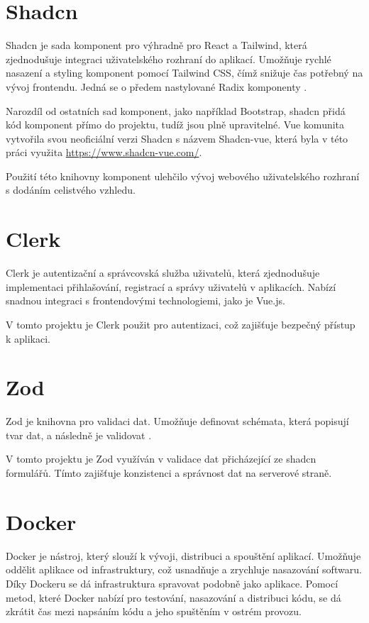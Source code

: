 \section{Shadcn}
Shadcn je sada komponent pro výhradně pro React a Tailwind, která zjednodušuje integraci uživatelského rozhraní do aplikací. Umožňuje rychlé nasazení a styling komponent pomocí Tailwind CSS, čímž snižuje čas potřebný na vývoj frontendu. Jedná se o předem nastylované Radix komponenty \cite{shadcnIntroduction}.

Narozdíl od ostatních sad komponent, jako například Bootstrap, shadcn přidá kód komponent přímo do projektu, tudíž jsou plně upravitelné. Vue komunita vytvořila svou neoficiální verzi Shadcn s názvem Shadcn-vue, která byla v této práci využita \url{https://www.shadcn-vue.com/}.

Použití této knihovny komponent ulehčilo vývoj webového uživatelského rozhraní s dodáním celistvého vzhledu.

\section{Clerk}
Clerk je autentizační a správcovská služba uživatelů, která zjednodušuje implementaci přihlašování, registrací a správy uživatelů v aplikacích. Nabízí snadnou integraci s frontendovými technologiemi, jako je Vue.js\cite{clerkClerkAuthentication}. 

V tomto projektu je Clerk použit pro autentizaci, což zajišťuje bezpečný přístup k aplikaci.

\section{Zod}
Zod je knihovna pro validaci dat. Umožňuje definovat schémata, která popisují tvar dat, a následně je validovat \cite{zodTypeScriptfirstSchema}.

V tomto projektu je Zod využíván v validace dat přicházející ze shadcn formulářů. Tímto zajišťuje konzistenci a správnost dat na serverové straně.

\section{Docker}
Docker je nástroj, který slouží k vývoji, distribuci a spouštění aplikací. Umožňuje oddělit aplikace od infrastruktury, což usnadňuje a zrychluje nasazování softwaru. Díky Dockeru se dá infrastruktura spravovat podobně jako aplikace. Pomocí metod, které Docker nabízí pro testování, nasazování a distribuci kódu, se dá zkrátit čas mezi napsáním kódu a jeho spuštěním v ostrém provozu\cite{a2024_what}.

